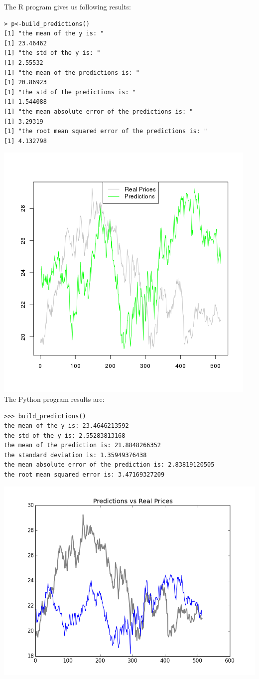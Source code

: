 \documentclass[
  twoside,
  12pt, a4paper,
  footinclude=true,
  headinclude=true,
  cleardoublepage=empty
]{article}
\begin{document}
The R program gives us following results:
\begin{verbatim}
> p<-build_predictions()
[1] "the mean of the y is: "
[1] 23.46462
[1] "the std of the y is: "
[1] 2.55532
[1] "the mean of the predictions is: "
[1] 20.86923
[1] "the std of the predictions is: "
[1] 1.544088
[1] "the mean absolute error of the predictions is: "
[1] 3.29319
[1] "the root mean squared error of the predictions is: "
[1] 4.132798
\end{verbatim}
\includegraphics[scale=0.75]{RPredicitions.png}
The Python program results are:
\begin{verbatim}
>>> build_predictions()
the mean of the y is: 23.4646213592
the std of the y is: 2.55283813168
the mean of the prediction is: 21.8848266352
the standard deviation is: 1.35949376438
the mean absolute error of the prediction is: 2.83819120505
the root mean squared error is: 3.47169327209
\end{verbatim}
\includegraphics[scale=0.75]{PythonPredictions.png}\\
\end{document}
